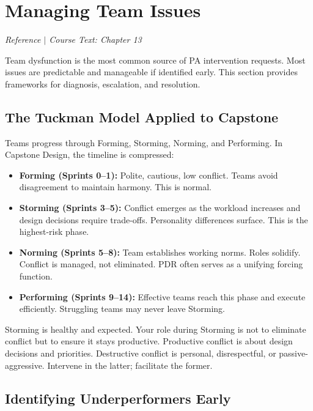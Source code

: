\section{Managing Team Issues}
\textit{Reference $|$ Course Text: Chapter 13}

Team dysfunction is the most common source of PA intervention requests. Most issues are predictable and manageable if identified early. This section provides frameworks for diagnosis, escalation, and resolution.

\subsection{The Tuckman Model Applied to Capstone}

Teams progress through Forming, Storming, Norming, and Performing. In Capstone Design, the timeline is compressed:

\begin{itemize}[nosep,leftmargin=1.5em]
\item \textbf{Forming (Sprints 0--1):} Polite, cautious, low conflict. Teams avoid disagreement to maintain harmony. This is normal.
\item \textbf{Storming (Sprints 3--5):} Conflict emerges as the workload increases and design decisions require trade-offs. Personality differences surface. This is the highest-risk phase.
\item \textbf{Norming (Sprints 5--8):} Team establishes working norms. Roles solidify. Conflict is managed, not eliminated. PDR often serves as a unifying forcing function.
\item \textbf{Performing (Sprints 9--14):} Effective teams reach this phase and execute efficiently. Struggling teams may never leave Storming.
\end{itemize}

\begin{bestpractice}
Storming is healthy and expected. Your role during Storming is not to eliminate conflict but to ensure it stays productive. Productive conflict is about design decisions and priorities. Destructive conflict is personal, disrespectful, or passive-aggressive. Intervene in the latter; facilitate the former.
\end{bestpractice}

\subsection{Identifying Underperformers Early}

